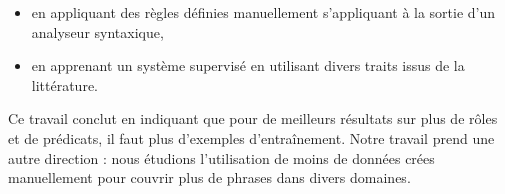 \begin{itemize}
    \item en appliquant des règles définies manuellement s'appliquant à la
        sortie d'un analyseur syntaxique,
    \item en apprenant un système supervisé en utilisant divers traits issus de
        la littérature.
\end{itemize}

Ce travail conclut en indiquant que pour de meilleurs résultats sur plus de
rôles et de prédicats, il faut plus d'exemples d'entraînement. Notre travail
prend une autre direction : nous étudions l'utilisation de moins de données
crées manuellement pour couvrir plus de phrases dans divers domaines.


